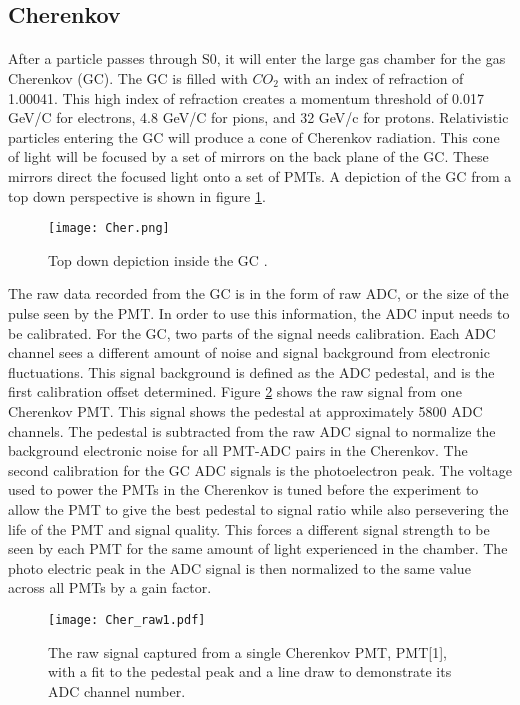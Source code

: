 	\subsection{Cherenkov}\label{sec:Cer}
	\paragraph{}After a particle passes through S0, it will enter the large gas chamber for the gas Cherenkov (GC). The GC is filled with $CO_2$ with an index of refraction of 1.00041. This high index of refraction creates a momentum threshold of 0.017 GeV/C for electrons, 4.8 GeV/C for pions, and 32 GeV/c for protons\cite{GasC}. Relativistic particles entering the GC will produce a cone of Cherenkov radiation. This cone of light will be focused by a set of mirrors on the back plane of the GC. These mirrors direct the focused light onto a set of PMTs. A depiction of the GC from a top down perspective is shown in figure \ref{fig:cer_TD}. 
	\begin{figure}[t]
		\centering
		\texttt{[image: Cher.png]}
		\caption{Top down depiction inside the GC \cite{GasC}.}
		\label{fig:cer_TD}
	\end{figure}
	The raw data recorded from the GC is in the form of raw ADC, or the size of the pulse seen by the PMT. In order to use this information, the ADC input needs to be calibrated. For the GC, two parts of the signal needs calibration. Each ADC channel sees a different amount of noise and signal background from electronic fluctuations. This signal background is defined as the ADC pedestal, and is the first calibration offset determined. Figure \ref{fig:cer_raw} shows the raw signal from one Cherenkov PMT. This signal shows the pedestal at approximately 5800 ADC channels. The pedestal is subtracted from the raw ADC signal to normalize the background electronic noise for all PMT-ADC pairs in the Cherenkov. The second calibration for the GC ADC signals is the photoelectron peak. The voltage used to power the PMTs in the Cherenkov is tuned before the experiment to allow the PMT to give the best pedestal to signal ratio while also persevering the life of the PMT and signal quality. This forces a different signal strength to be seen by each PMT for the same amount of light experienced in the chamber. The photo electric peak in the ADC signal is then normalized to the same value across all PMTs by a gain factor. 
	\begin{figure}[t]
		\centering
		\texttt{[image: Cher\_raw1.pdf]}
		\caption{The raw signal captured from a single Cherenkov PMT, PMT[1], with a fit to the pedestal peak and a line draw to demonstrate its ADC channel number.}
		\label{fig:cer_raw}
	\end{figure}
